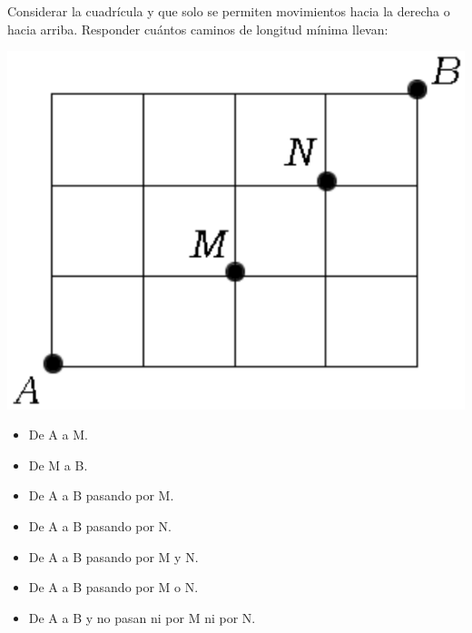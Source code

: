 \documentclass[12pt]{article}
\begin{document}
\begin{problema}
    Considerar la cuadrícula y que solo se permiten movimientos hacia la derecha o hacia arriba. Responder cuántos caminos de longitud mínima llevan:

    \begin{center}
        \includegraphics[scale=0.6]{Imagenes/IMG3/Caminos4.png}
    \end{center}

    \begin{itemize}
        \item De A a M.
        \item De M a B.
        \item De A a B pasando por M.
        \item De A a B pasando por N.
        \item De A a B pasando por M y N.
        \item De A a B pasando por M o N.
        \item De A a B y no pasan ni por M ni por N.
    \end{itemize}
    
\end{problema}
\end{document}
